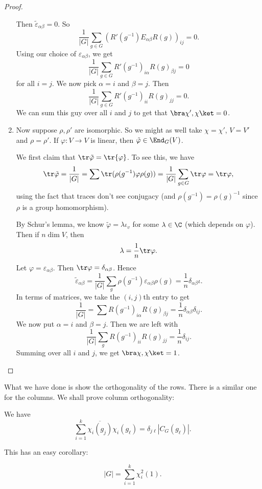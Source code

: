 \documentclass[a4paper]{article}
\begin{document}
\begin{proof}
\begin{enumerate}
      Then $\tilde{\varepsilon}_{\alpha\beta} = 0$. So
      \[
        \frac{1}{|G|} \sum_{g \in G} (R'(g^{-1}) E_{\alpha\beta}R(g))_{ij} = 0.
      \]
      Using our choice of $\varepsilon_{\alpha\beta}$, we get
      \[
        \frac{1}{|G|} \sum_{g \in G} R'(g^{-1})_{i\alpha} R(g)_{\beta j} = 0
      \]
      for all $i = j$. We now pick $\alpha = i$ and $\beta = j$. Then
      \[
        \frac{1}{|G|} \sum_{g \in G}R'(g^{-1})_{ii} R(g)_{jj} = 0.
      \]
      We can sum this guy over all $i$ and $j$ to get that $\bra \chi', \chi\ket = 0$.

    \item Now suppose $\rho, \rho'$ are isomorphic. So we might as well take $\chi = \chi'$, $V = V'$ and $\rho = \rho'$. If $\varphi: V \to V$ is linear, then $\tilde{\varphi} \in \End_G(V)$.

      We first claim that $\tr \tilde{\varphi} = \tr{\varphi}$. To see this, we have
      \[
        \tr \tilde{\varphi} = \frac{1}{|G|} = \sum \tr(\rho(g^{-1}) \varphi \rho(g)) = \frac{1}{|G|} \sum_{g \in G} \tr \varphi = \tr \varphi,
      \]
      using the fact that traces don't see conjugacy (and $\rho(g^{-1}) = \rho(g)^{-1}$ since $\rho$ is a group homomorphism).

      By Schur's lemma, we know $\tilde{\varphi} = \lambda \iota_v$ for some $\lambda \in \C$ (which depends on $\varphi$). Then if $n \dim V$, then
      \[
        \lambda = \frac{1}{n} \tr \varphi.
      \]
      Let $\varphi = \varepsilon_{\alpha\beta}$. Then $\tr \varphi = \delta_{\alpha\beta}$. Hence
      \[
        \tilde{\varepsilon}_{\alpha\beta} = \frac{1}{|G|} \sum_g \rho(g^{-1}) \varepsilon_{\alpha\beta}\rho(g) = \frac{1}{n} \delta_{\alpha\beta} \iota.
      \]
      In terms of matrices, we take the $(i, j)$th entry to get
      \[
        \frac{1}{|G|} = \sum R(g^{-1})_{i\alpha} R(g)_{\beta j} = \frac{1}{n} \delta_{\alpha\beta} \delta_{ij}.
      \]
      We now put $\alpha = i$ and $\beta = j$. Then we are left with
      \[
        \frac{1}{|G|} \sum_g R(g^{-1})_{ii} R(g)_{jj} = \frac{1}{n} \delta_{ij}.
      \]
      Summing over all $i$ and $j$, we get $\bra \chi, \chi \ket = 1$.
  \end{enumerate}
\end{proof}

What we have done is show the orthogonality of the rows. There is a similar one for the columns. We shall prove column orthogonality:

\begin{thm}
  We have
  \[
    \sum_{i = 1}^k \overline{\chi_i (g_j)}\chi_i (g_\ell) = \delta_{j\ell} |C_G(g_\ell)|.
  \]
\end{thm}
This has an easy corollary:
\begin{cor}
  \[
    |G| = \sum_{i = 1}^k \chi_i^2 (1).
  \]
\end{cor}
\end{document}
